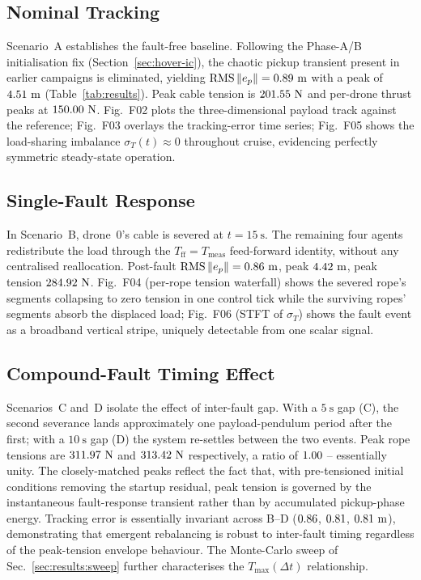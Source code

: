 \subsection{Nominal Tracking}
\label{sec:results:nominal}
Scenario~A establishes the fault-free baseline. Following the Phase-A/B
initialisation fix (Section~\ref{sec:hover-ic}), the chaotic pickup
transient present in earlier campaigns is eliminated, yielding
$\mathrm{RMS}\,\lVert e_p\rVert=0.89~\si{\metre}$ with a peak of
$4.51~\si{\metre}$ (Table~\ref{tab:results}). Peak cable tension
is $201.55~\si{\newton}$ and per-drone thrust peaks at
$150.00~\si{\newton}$. Fig.~F02 plots the three-dimensional
payload track against the reference; Fig.~F03 overlays the
tracking-error time series; Fig.~F05 shows the load-sharing
imbalance $\sigma_T(t)\approx 0$ throughout cruise, evidencing
perfectly symmetric steady-state operation.

\subsection{Single-Fault Response}
\label{sec:results:single}
In Scenario~B, drone~0's cable is severed at $t=\SI{15}{\second}$. The
remaining four agents redistribute the load through the
$T_{\mathrm{ff}}=T_{\mathrm{meas}}$ feed-forward identity, without any
centralised reallocation. Post-fault
$\mathrm{RMS}\,\lVert e_p\rVert=0.86~\si{\metre}$, peak
$4.42~\si{\metre}$, peak tension $284.92~\si{\newton}$.
Fig.~F04 (per-rope tension waterfall) shows the severed rope's
segments collapsing to zero tension in one control tick while the
surviving ropes' segments absorb the displaced load;
Fig.~F06 (STFT of $\sigma_T$) shows the fault event as a broadband
vertical stripe, uniquely detectable from one scalar signal.

\subsection{Compound-Fault Timing Effect}
\label{sec:results:compound}
Scenarios~C and~D isolate the effect of inter-fault gap. With a
$\SI{5}{\second}$ gap (C), the second severance lands
approximately one payload-pendulum period after the first; with a
$\SI{10}{\second}$ gap (D) the system re-settles between the two
events. Peak rope tensions are $311.97~\si{\newton}$ and
$313.42~\si{\newton}$ respectively, a ratio of $1.00$ --
essentially unity. The closely-matched peaks reflect the fact that,
with pre-tensioned initial conditions removing the startup
residual, peak tension is governed by the instantaneous
fault-response transient rather than by accumulated pickup-phase
energy. Tracking error is essentially invariant across B--D
($0.86$, $0.81$, $0.81~\si{\metre}$),
demonstrating that emergent rebalancing is robust to inter-fault
timing regardless of the peak-tension envelope behaviour. The
Monte-Carlo sweep of Sec.~\ref{sec:results:sweep} further
characterises the $T_{\max}(\Delta t)$ relationship.

